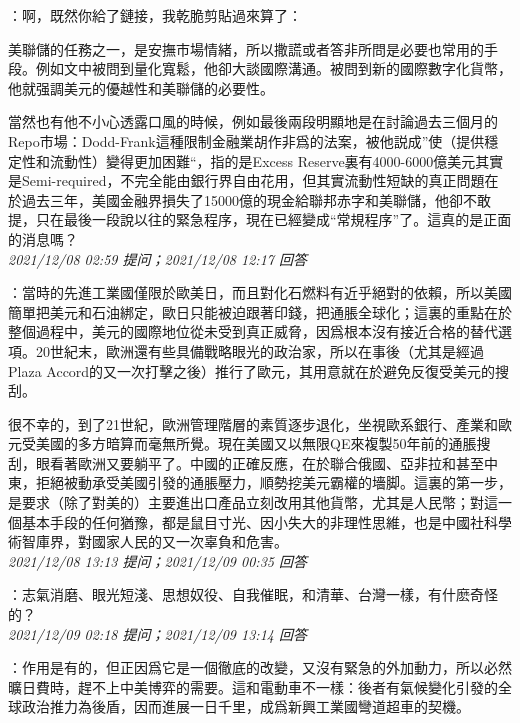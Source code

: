 \documentclass[twocolumn]{ctexart}
\begin{document}
：啊，既然你給了鏈接，我乾脆剪貼過來算了：

美聯儲的任務之一，是安撫市場情緒，所以撒謊或者答非所問是必要也常用的手段。例如文中被問到量化寬鬆，他卻大談國際溝通。被問到新的國際數字化貨幣，他就强調美元的優越性和美聯儲的必要性。

當然也有他不小心透露口風的時候，例如最後兩段明顯地是在討論過去三個月的Repo市場：Dodd-Frank這種限制金融業胡作非爲的法案，被他説成”使（提供穩定性和流動性）變得更加困難“，指的是Excess Reserve裏有4000-6000億美元其實是Semi-required，不完全能由銀行界自由花用，但其實流動性短缺的真正問題在於過去三年，美國金融界損失了15000億的現金給聯邦赤字和美聯儲，他卻不敢提，只在最後一段說以往的緊急程序，現在已經變成“常規程序”了。這真的是正面的消息嗎？
\\

\textit{\hfill\noindent\small 2021/12/08 02:59 提问；2021/12/08 12:17 回答}

：當時的先進工業國僅限於歐美日，而且對化石燃料有近乎絕對的依賴，所以美國簡單把美元和石油綁定，歐日只能被迫跟著印錢，把通脹全球化；這裏的重點在於整個過程中，美元的國際地位從未受到真正威脅，因爲根本沒有接近合格的替代選項。20世紀末，歐洲還有些具備戰略眼光的政治家，所以在事後（尤其是經過Plaza Accord的又一次打擊之後）推行了歐元，其用意就在於避免反復受美元的搜刮。

很不幸的，到了21世紀，歐洲管理階層的素質逐步退化，坐視歐系銀行、產業和歐元受美國的多方暗算而毫無所覺。現在美國又以無限QE來複製50年前的通脹搜刮，眼看著歐洲又要躺平了。中國的正確反應，在於聯合俄國、亞非拉和甚至中東，拒絕被動承受美國引發的通脹壓力，順勢挖美元霸權的墻脚。這裏的第一步，是要求（除了對美的）主要進出口產品立刻改用其他貨幣，尤其是人民幣；對這一個基本手段的任何猶豫，都是鼠目寸光、因小失大的非理性思維，也是中國社科學術智庫界，對國家人民的又一次辜負和危害。
\\

\textit{\hfill\noindent\small 2021/12/08 13:13 提问；2021/12/09 00:35 回答}

：志氣消磨、眼光短淺、思想奴役、自我催眠，和清華、台灣一樣，有什麽奇怪的？
\\

\textit{\hfill\noindent\small 2021/12/09 02:18 提问；2021/12/09 13:14 回答}

：作用是有的，但正因爲它是一個徹底的改變，又沒有緊急的外加動力，所以必然曠日費時，趕不上中美博弈的需要。這和電動車不一樣：後者有氣候變化引發的全球政治推力為後盾，因而進展一日千里，成爲新興工業國彎道超車的契機。
\\
\end{document}
